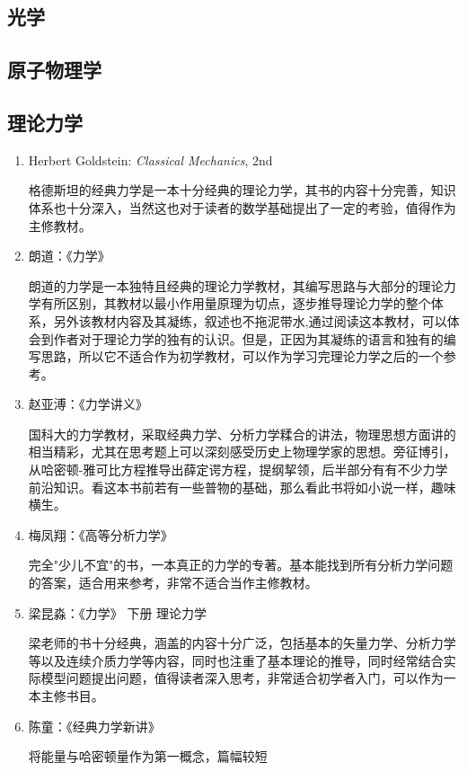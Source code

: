 \subsection*{光学}

\subsection*{原子物理学}

\subsection*{理论力学}

\begin{enumerate}
  \item Herbert Goldstein: \textit{Classical Mechanics}, 2nd

  格德斯坦的经典力学是一本十分经典的理论力学，其书的内容十分完善，知识体系也十分深入，当然这也对于读者的数学基础提出了一定的考验，值得作为主修教材。
  \item 朗道：《力学》

  朗道的力学是一本独特且经典的理论力学教材，其编写思路与大部分的理论力学有所区别，其教材以最小作用量原理为切点，逐步推导理论力学的整个体系，另外该教材内容及其凝练，叙述也不拖泥带水,通过阅读这本教材，可以体会到作者对于理论力学的独有的认识。但是，正因为其凝练的语言和独有的编写思路，所以它不适合作为初学教材，可以作为学习完理论力学之后的一个参考。
  \item 赵亚溥：《力学讲义》

  国科大的力学教材，采取经典力学、分析力学糅合的讲法，物理思想方面讲的相当精彩，尤其在思考题上可以深刻感受历史上物理学家的思想。旁征博引，从哈密顿-雅可比方程推导出薛定谔方程，提纲挈领，后半部分有有不少力学前沿知识。看这本书前若有一些普物的基础，那么看此书将如小说一样，趣味横生。
  \item 梅凤翔：《高等分析力学》

  完全"少儿不宜"的书，一本真正的力学的专著。基本能找到所有分析力学问题的答案，适合用来参考，非常不适合当作主修教材。
  \item 梁昆淼：《力学》 下册 理论力学

  梁老师的书十分经典，涵盖的内容十分广泛，包括基本的矢量力学、分析力学等以及连续介质力学等内容，同时也注重了基本理论的推导，同时经常结合实际模型问题提出问题，值得读者深入思考，非常适合初学者入门，可以作为一本主修书目。

  \item 陈童：《经典力学新讲》

  将能量与哈密顿量作为第一概念，篇幅较短


\end{enumerate}
